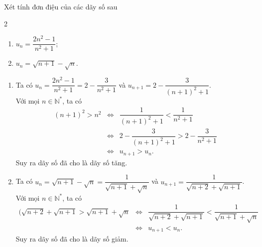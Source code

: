 \begin{vd}%
	Xét tính đơn điệu của các dãy số sau
	\begin{multicols}{2}
		\begin{enumerate}
			\item $u_n=\dfrac{2n^2-1}{n^2+1}$;
			\item $u_n=\sqrt{n+1}-\sqrt{n}$.
		\end{enumerate}
	\end{multicols}
	\loigiai 
	{
		\begin{enumerate}
			\item Ta có $u_n=\dfrac{2n^2-1}{n^2+1}=2-\dfrac{3}{n^2+1}$ và $u_{n+1}=2-\dfrac{3}{(n+1)^2+1}$.\\
			Với mọi $n\in \mathbb{N}^*$, ta có
			\allowdisplaybreaks
			\begin{eqnarray*}
				(n+1)^2>n^2&\Leftrightarrow&\dfrac{1}{(n+1)^2+1}<\dfrac{1}{n^2+1}\\
				&\Leftrightarrow&2-\dfrac{3}{(n+1)^2+1}>2-\dfrac{3}{n^2+1}\\
				&\Leftrightarrow& u_{n+1}>u_n.
			\end{eqnarray*}
			Suy ra dãy số đã cho là dãy số tăng.
			\item Ta có $u_n=\sqrt{n+1}-\sqrt{n}=\dfrac{1}{\sqrt{n+1}+\sqrt{n}}$ và $u_{n+1}=\dfrac{1}{\sqrt{n+2}+\sqrt{n+1}}$.\\
			Với mọi $n\in \mathbb{N}^*$, ta có
			\allowdisplaybreaks
			\begin{eqnarray*}
				(\sqrt{n+2}+\sqrt{n+1}>\sqrt{n+1}+\sqrt{n}&\Leftrightarrow&\dfrac{1}{\sqrt{n+2}+\sqrt{n+1}}<\dfrac{1}{\sqrt{n+1}+\sqrt{n}}\\
				&\Leftrightarrow& u_{n+1}<u_n.
			\end{eqnarray*}
			Suy ra dãy số đã cho là dãy số giảm.
		\end{enumerate}
	}
\end{vd}


